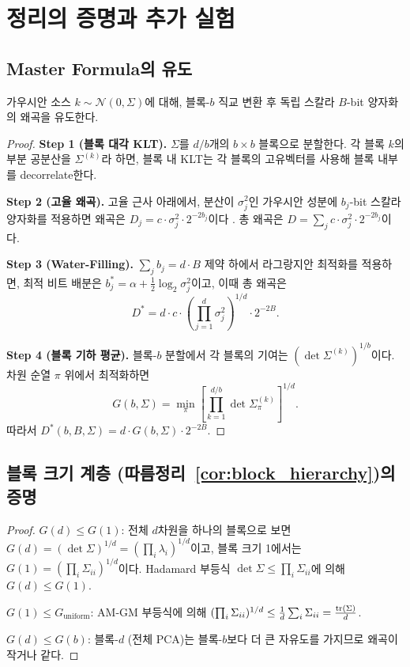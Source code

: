 \section{정리의 증명과 추가 실험}
\label{sec:proofs}

\subsection{Master Formula의 유도}
\label{sec:proof_master}

가우시안 소스 $k \sim \mathcal{N}(0, \Sigma)$에 대해, 블록-$b$ 직교 변환 후 독립 스칼라 $B$-bit 양자화의 왜곡을 유도한다.

\begin{proof}
\textbf{Step 1 (블록 대각 KLT).}
$\Sigma$를 $d/b$개의 $b \times b$ 블록으로 분할한다. 각 블록 $k$의 부분 공분산을 $\Sigma^{(k)}$라 하면, 블록 내 KLT는 각 블록의 고유벡터를 사용해 블록 내부를 decorrelate한다.

\textbf{Step 2 (고율 왜곡).}
고율 근사 아래에서, 분산이 $\sigma_j^2$인 가우시안 성분에 $b_j$-bit 스칼라 양자화를 적용하면 왜곡은 $D_j = c \cdot \sigma_j^2 \cdot 2^{-2b_j}$이다 \citep{cover2006elements}. 총 왜곡은 $D = \sum_j c \cdot \sigma_j^2 \cdot 2^{-2b_j}$이다.

\textbf{Step 3 (Water-Filling).}
$\sum_j b_j = d \cdot B$ 제약 하에서 라그랑지안 최적화를 적용하면, 최적 비트 배분은 $b_j^* = \alpha + \frac{1}{2}\log_2 \sigma_j^2$이고, 이때 총 왜곡은
\[
D^* = d \cdot c \cdot \left(\prod_{j=1}^{d} \sigma_j^2\right)^{1/d} \cdot 2^{-2B}.
\]

\textbf{Step 4 (블록 기하 평균).}
블록-$b$ 분할에서 각 블록의 기여는 $(\det \Sigma^{(k)})^{1/b}$이다. 차원 순열 $\pi$ 위에서 최적화하면
\[
G(b, \Sigma) = \min_\pi \left[\prod_{k=1}^{d/b} \det \Sigma^{(k)}_\pi\right]^{1/d}.
\]
따라서 $D^*(b, B, \Sigma) = d \cdot G(b, \Sigma) \cdot 2^{-2B}$.
\end{proof}

\subsection{블록 크기 계층 (따름정리~\ref{cor:block_hierarchy})의 증명}

\begin{proof}
$G(d) \leq G(1)$: 전체 $d$차원을 하나의 블록으로 보면 $G(d) = (\det \Sigma)^{1/d} = (\prod_i \lambda_i)^{1/d}$이고, 블록 크기 1에서는 $G(1) = (\prod_i \Sigma_{ii})^{1/d}$이다. Hadamard 부등식 $\det \Sigma \leq \prod_i \Sigma_{ii}$에 의해 $G(d) \leq G(1)$.

$G(1) \leq G_{\mathrm{uniform}}$: AM-GM 부등식에 의해 $(\prod_i \Sigma_{ii})^{1/d} \leq \frac{1}{d}\sum_i \Sigma_{ii} = \frac{\mathrm{tr}(\Sigma)}{d}$.

$G(d) \leq G(b)$: 블록-$d$ (전체 PCA)는 블록-$b$보다 더 큰 자유도를 가지므로 왜곡이 작거나 같다.
\end{proof}

